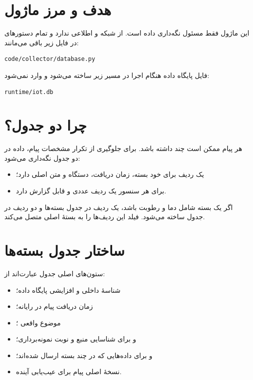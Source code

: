 \section{هدف و مرز ماژول}
این ماژول فقط مسئول نگه‌داری داده است. از شبکه و
اطلاعی ندارد و تمام دستورهای
در فایل زیر باقی می‌مانند:

\begin{LTR}
\begin{lstlisting}
code/collector/database.py
\end{lstlisting}
\end{LTR}

فایل پایگاه داده هنگام اجرا در مسیر زیر ساخته می‌شود و وارد
نمی‌شود:

\begin{LTR}
\begin{lstlisting}
runtime/iot.db
\end{lstlisting}
\end{LTR}

\section{چرا دو جدول؟}
هر پیام ممکن است چند
داشته باشد. برای جلوگیری از تکرار مشخصات پیام، داده در دو جدول نگه‌داری می‌شود:

\begin{itemize}
  \item
  یک ردیف برای خود بسته، زمان دریافت، دستگاه و متن اصلی
  دارد؛
  \item
  برای هر سنسور یک ردیف عددی و قابل گزارش دارد.
\end{itemize}

اگر یک بسته شامل دما و رطوبت باشد، یک ردیف در جدول بسته‌ها و دو ردیف در جدول
ساخته می‌شود. فیلد
این ردیف‌ها را به بستهٔ اصلی متصل می‌کند.

\section{ساختار جدول بسته‌ها}
ستون‌های اصلی جدول
عبارت‌اند از:

\begin{itemize}
  \item
  شناسهٔ داخلی و افزایشی پایگاه داده؛
  \item
  زمان دریافت پیام در رایانه؛
  \item
  موضوع واقعی
  ؛
  \item
  و
  برای شناسایی منبع و نوبت نمونه‌برداری؛
  \item
  و
  برای داده‌هایی که در چند بسته ارسال شده‌اند؛
  \item
  نسخهٔ اصلی پیام برای عیب‌یابی آینده.
\end{itemize}

